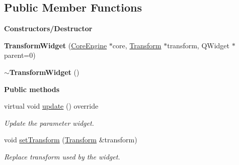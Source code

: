\subsection*{Public Member Functions}
\begin{Indent}\textbf{ Constructors/\+Destructor}\par
\begin{DoxyCompactItemize}
\item 
\mbox{\label{classrev_1_1_view_1_1_transform_widget_adc6c3f645b781281aca053fd185785f6}} 
{\bfseries Transform\+Widget} (\mbox{\hyperlink{classrev_1_1_core_engine}{Core\+Engine}} $\ast$core, \mbox{\hyperlink{classrev_1_1_transform}{Transform}} $\ast$transform, Q\+Widget $\ast$parent=0)
\item 
\mbox{\label{classrev_1_1_view_1_1_transform_widget_ad7235000898ecf2acb554b0e9001d181}} 
{\bfseries $\sim$\+Transform\+Widget} ()
\end{DoxyCompactItemize}
\end{Indent}
\begin{Indent}\textbf{ Public methods}\par
\begin{DoxyCompactItemize}
\item 
\mbox{\label{classrev_1_1_view_1_1_transform_widget_a6e71534d80c345203f8e9de5a917d99b}} 
virtual void \mbox{\hyperlink{classrev_1_1_view_1_1_transform_widget_a6e71534d80c345203f8e9de5a917d99b}{update}} () override
\begin{DoxyCompactList}\small\item\em Update the parameter widget. \end{DoxyCompactList}\item 
\mbox{\label{classrev_1_1_view_1_1_transform_widget_ab946425169596f1e9f8c5b9a91cfde4c}} 
void \mbox{\hyperlink{classrev_1_1_view_1_1_transform_widget_ab946425169596f1e9f8c5b9a91cfde4c}{set\+Transform}} (\mbox{\hyperlink{classrev_1_1_transform}{Transform}} \&transform)
\begin{DoxyCompactList}\small\item\em Replace transform used by the widget. \end{DoxyCompactList}\end{DoxyCompactItemize}
\end{Indent}
